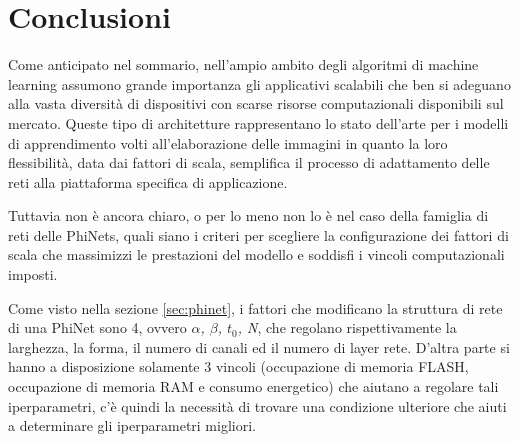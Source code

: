 
\chapter{Conclusioni}
\label{cha:conclusioni}

Come anticipato nel sommario, nell'ampio ambito degli algoritmi di machine learning assumono grande importanza gli applicativi scalabili che ben si adeguano alla vasta diversità di dispositivi con scarse risorse computazionali disponibili sul mercato. 
Queste tipo di architetture rappresentano lo stato dell'arte per i modelli di apprendimento volti all'elaborazione delle immagini in quanto la loro flessibilità, data dai fattori di scala, semplifica il processo di adattamento delle reti alla piattaforma specifica di applicazione.

Tuttavia non è ancora chiaro, o per lo meno non lo è nel caso della famiglia di reti delle PhiNets, quali siano i criteri per scegliere la configurazione dei fattori di scala che massimizzi le prestazioni del modello e soddisfi i vincoli computazionali imposti.

Come visto nella sezione \ref{sec:phinet}, i fattori che modificano la struttura di rete di una PhiNet sono 4, ovvero \textit{$\alpha$, $\beta$, $t_{0}$, N}, che regolano rispettivamente la larghezza, la forma, il numero di canali ed il numero di layer rete. D'altra parte si hanno a disposizione solamente 3 vincoli (occupazione di memoria FLASH, occupazione di memoria RAM e consumo energetico) che aiutano a regolare tali iperparametri, c'è quindi la necessità di trovare una condizione ulteriore che aiuti a determinare gli iperparametri migliori. 

